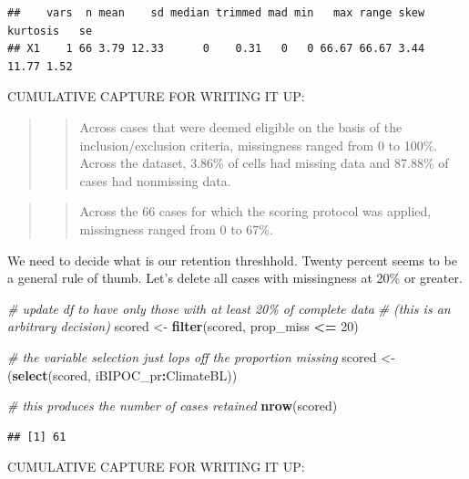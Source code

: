 \documentclass[
  11pt,
]{book}
\newenvironment{Shaded}{\begin{snugshade}}{\end{snugshade}}
\newcommand{\CommentTok}[1]{\textcolor[rgb]{0.37,0.37,0.37}{\textit{#1}}}
\newcommand{\DecValTok}[1]{\textcolor[rgb]{0.06,0.06,0.06}{#1}}
\newcommand{\FunctionTok}[1]{\textcolor[rgb]{0.27,0.27,0.27}{\textbf{#1}}}
\newcommand{\NormalTok}[1]{#1}
\newcommand{\OtherTok}[1]{\textcolor[rgb]{0.37,0.37,0.37}{#1}}
\newcommand{\SpecialCharTok}[1]{\textcolor[rgb]{0.43,0.43,0.43}{\textbf{#1}}}
\begin{document}
\begin{verbatim}
##    vars  n mean    sd median trimmed mad min   max range skew kurtosis   se
## X1    1 66 3.79 12.33      0    0.31   0   0 66.67 66.67 3.44    11.77 1.52
\end{verbatim}

CUMULATIVE CAPTURE FOR WRITING IT UP:

\begin{quote}
\begin{quote}
Across cases that were deemed eligible on the basis of the inclusion/exclusion criteria, missingness ranged from 0 to 100\%. Across the dataset, 3.86\% of cells had missing data and 87.88\% of cases had nonmissing data.
\end{quote}
\end{quote}

\begin{quote}
\begin{quote}
Across the 66 cases for which the scoring protocol was applied, missingness ranged from 0 to 67\%.
\end{quote}
\end{quote}

We need to decide what is our retention threshhold. Twenty percent seems to be a general rule of thumb. Let's delete all cases with missingness at 20\% or greater.

\begin{Shaded}
\begin{Highlighting}[]
\CommentTok{\# update df to have only those with at least 20\% of complete data}
\CommentTok{\# (this is an arbitrary decision)}
\NormalTok{scored }\OtherTok{\textless{}{-}} \FunctionTok{filter}\NormalTok{(scored, prop\_miss }\SpecialCharTok{\textless{}=} \DecValTok{20}\NormalTok{)}

\CommentTok{\# the variable selection just lops off the proportion missing}
\NormalTok{scored }\OtherTok{\textless{}{-}}\NormalTok{ (}\FunctionTok{select}\NormalTok{(scored, iBIPOC\_pr}\SpecialCharTok{:}\NormalTok{ClimateBL))}

\CommentTok{\# this produces the number of cases retained}
\FunctionTok{nrow}\NormalTok{(scored)}
\end{Highlighting}
\end{Shaded}

\begin{verbatim}
## [1] 61
\end{verbatim}

CUMULATIVE CAPTURE FOR WRITING IT UP:
\end{document}

